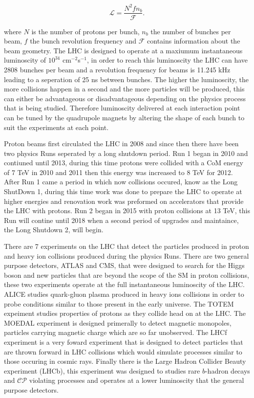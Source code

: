 \begin{equation}
\mathcal{L} = \frac{N^{2} f n_{b}}{\mathcal{F}}.
\label{eq:inst_lumi}
\end{equation}

where $N$ is the number of protons per bunch, $n_{b}$ the number of bunches per beam, $f$ the bunch revolution frequency and $\mathcal{F}$ contains information about the beam geometry. The LHC is designed to operate at a maxiumum instantaneous luminoscity of $10^{34}$ cm$^{-2}$s$^{-1}$, in order to reach this luminoscity the LHC can have 2808 bunches per beam and a revolution frequency for beams is 11.245 kHz leading to a seperation of 25 ns between bunches. The higher the luminoscity, the more collisions happen in a second and the more particles will be produced, this can either be advantageous or disadvantageous depending on the physics process that is being studied.
Therefore luminoscity delivered at each interaction point can be tuned by the quadrupole magnets by altering the shape of each bunch to suit the experiments at each point.

Proton beams first circulated the LHC in 2008 and since then there have been two physics Runs seperated by a long shutdown period. Run 1 began in 2010 and contiuned until 2013, during this time protons were collided with a CoM energy of 7 TeV in 2010 and 2011 then this energy was increased to 8 TeV for 2012. After Run 1 came a period in which now collisions occured, know as the Long ShutDown 1, during this time work was done to prepare the LHC to operate at higher energies and renovation work was preformed on accelerators that provide the LHC with protons. Run 2 began in 2015 with proton collisions at 13 TeV, this Run will contine until 2018 when a second period of upgrades and maintaince, the Long Shutdown 2, will begin.




There are 7 experiments on the LHC that detect the particles produced in proton and heavy ion collisions produced during the physics Runs. There are two general purpose detectors, ATLAS and CMS, that were designed to search for the Higgs boson and new particles that are beyond the scope of the SM in proton collisions, these two experiments operate at the full instantaneous luminoscity of the LHC. %
ALICE studies quark-gluon plasma produced in heavy ions collisions in order to probe conditions similar to those present in the early universe. The TOTEM expeiment studies properties of protons as they collide head on at the LHC. The MOEDAL experiment is designed primerally to detect magnetic monopoles, particles carrying magnetic charge which are so far unobserved. The LHCf experiment is a very foward experiment that is designed to detect particles that are thrown forward in LHC collisions which would simulate processes similar to those occuring in cosmic rays. Finally there is the Large Hadron Collider Beauty experiment (LHCb), this experiment was designed to studies rare $b$-hadron decays and $\mathcal{CP}$ violating processes and operates at a lower luminoscity that the general purpose detectors. 




